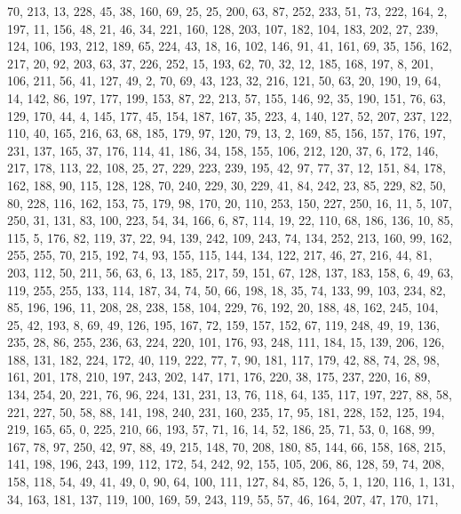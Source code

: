 \begin{DoxyCode}
       70, 213, 13, 228, 45, 38, 160, 69, 25, 25, 200, 63, 87, 252, 233, 51, 73, 222, 164, 2, 197, 11, 156, 48, 21,
       46, 34, 221, 160, 128, 203, 107, 182, 104, 183, 202, 27, 239, 124, 106, 193, 212, 189, 65, 224, 43, 18, 16,
       102, 146, 91, 41, 161, 69, 35, 156, 162, 217, 20, 92, 203, 63, 37, 226, 252, 15, 193, 62, 70, 32, 12, 185,
       168, 197, 8, 201, 106, 211, 56, 41, 127, 49, 2, 70, 69, 43, 123, 32, 216, 121, 50, 63, 20, 190, 19, 64, 14,
       142, 86, 197, 177, 199, 153, 87, 22, 213, 57, 155, 146, 92, 35, 190, 151, 76, 63, 129, 170, 44, 4, 145, 177,
       45, 154, 187, 167, 35, 223, 4, 140, 127, 52, 207, 237, 122, 110, 40, 165, 216, 63, 68, 185, 179, 97, 120,
       79, 13, 2, 169, 85, 156, 157, 176, 197, 231, 137, 165, 37, 176, 114, 41, 186, 34, 158, 155, 106, 212, 120,
       37, 6, 172, 146, 217, 178, 113, 22, 108, 25, 27, 229, 223, 239, 195, 42, 97, 77, 37, 12, 151, 84, 178, 162,
       188, 90, 115, 128, 128, 70, 240, 229, 30, 229, 41, 84, 242, 23, 85, 229, 82, 50, 80, 228, 116, 162, 153, 75,
       179, 98, 170, 20, 110, 253, 150, 227, 250, 16, 11, 5, 107, 250, 31, 131, 83, 100, 223, 54, 34, 166, 6, 87,
       114, 19, 22, 110, 68, 186, 136, 10, 85, 115, 5, 176, 82, 119, 37, 22, 94, 139, 242, 109, 243, 74, 134, 252,
       213, 160, 99, 162, 255, 255, 70, 215, 192, 74, 93, 155, 115, 144, 134, 122, 217, 46, 27, 216, 44, 81, 203,
       112, 50, 211, 56, 63, 6, 13, 185, 217, 59, 151, 67, 128, 137, 183, 158, 6, 49, 63, 119, 255, 255, 133, 114,
       187, 34, 74, 50, 66, 198, 18, 35, 74, 133, 99, 103, 234, 82, 85, 196, 196, 11, 208, 28, 238, 158, 104, 229, 76,
       192, 20, 188, 48, 162, 245, 104, 25, 42, 193, 8, 69, 49, 126, 195, 167, 72, 159, 157, 152, 67, 119, 248,
       49, 19, 136, 235, 28, 86, 255, 236, 63, 224, 220, 101, 176, 93, 248, 111, 184, 15, 139, 206, 126, 188, 131,
       182, 224, 172, 40, 119, 222, 77, 7, 90, 181, 117, 179, 42, 88, 74, 28, 98, 161, 201, 178, 210, 197, 243, 202,
       147, 171, 176, 220, 38, 175, 237, 220, 16, 89, 134, 254, 20, 221, 76, 96, 224, 131, 231, 13, 76, 118, 64,
       135, 117, 197, 227, 88, 58, 221, 227, 50, 58, 88, 141, 198, 240, 231, 160, 235, 17, 95, 181, 228, 152, 125,
       194, 219, 165, 65, 0, 225, 210, 66, 193, 57, 71, 16, 14, 52, 186, 25, 71, 53, 0, 168, 99, 167, 78, 97, 250,
       42, 97, 88, 49, 215, 148, 70, 208, 180, 85, 144, 66, 158, 168, 215, 141, 198, 196, 243, 199, 112, 172, 54,
       242, 92, 155, 105, 206, 86, 128, 59, 74, 208, 158, 118, 54, 49, 41, 49, 0, 90, 64, 100, 111, 127, 84, 85, 126,
       5, 1, 120, 116, 1, 131, 34, 163, 181, 137, 119, 100, 169, 59, 243, 119, 55, 57, 46, 164, 207, 47, 170, 171,

\end{DoxyCode}
